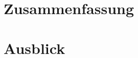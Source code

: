 \documentclass[10pt, a4paper]{scrreprt}
\begin{document}
\section{Zusammenfassung}
\section{Ausblick}
	






\printindex


\end{document}
